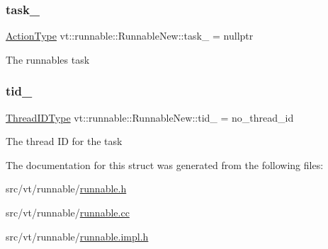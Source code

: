 \subsubsection{\texorpdfstring{task\+\_\+}{task\_}}
{\footnotesize\ttfamily \hyperlink{namespacevt_ae0a5a7b18cc99d7b732cb4d44f46b0f3}{Action\+Type} vt\+::runnable\+::\+Runnable\+New\+::task\+\_\+ = nullptr\hspace{0.3cm}{\ttfamily [private]}}

The runnable\textquotesingle{}s task \mbox{\label{structvt_1_1runnable_1_1_runnable_new_ad0e857fdce2f1c13512a1415993cd7fe}} 
\subsubsection{\texorpdfstring{tid\+\_\+}{tid\_}}
{\footnotesize\ttfamily \hyperlink{namespacevt_a9b887d814dd25ff495a0c8270304ac02}{Thread\+I\+D\+Type} vt\+::runnable\+::\+Runnable\+New\+::tid\+\_\+ = no\+\_\+thread\+\_\+id\hspace{0.3cm}{\ttfamily [private]}}

The thread ID for the task 

The documentation for this struct was generated from the following files\+:\begin{DoxyCompactItemize}
\item 
src/vt/runnable/\hyperlink{runnable_8h}{runnable.\+h}\item 
src/vt/runnable/\hyperlink{runnable_8cc}{runnable.\+cc}\item 
src/vt/runnable/\hyperlink{runnable_8impl_8h}{runnable.\+impl.\+h}\end{DoxyCompactItemize}
